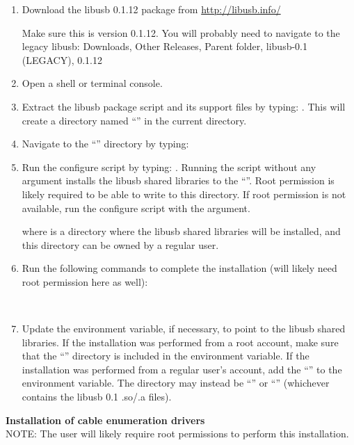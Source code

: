 \begin{enumerate}
\item Download the libusb 0.1.12 package from \url{http://libusb.info/}

Make sure this is version 0.1.12. You will probably need to navigate to the legacy libusb:
\subitem Downloads, Other Releases, Parent folder, libusb-0.1 (LEGACY), 0.1.12
\item Open a shell or terminal console.
\item Extract the libusb package script and its support files by typing: . This will create a directory named ``'' in the current directory.
\item Navigate to the ``'' directory by typing: \\
\item Run the configure script by typing: . Running the  script without any argument installs the libusb shared libraries to the ``''. Root permission is likely required to be able to write to this directory. If root permission is not available, run the configure script with the  argument. \\

where  is a directory where the libusb shared libraries will be installed, and this directory can be owned by a regular user.

\item Run the following commands to complete the installation (will likely need root permission here as well):

 \\

\item Update the  environment variable, if necessary, to point to the libusb shared libraries. If the installation was performed from a root account, make sure that the ``'' directory is included in the  environment variable. If the installation was performed from a regular user's account, add the ``'' to the  environment variable. The directory may instead be ``'' or ``'' (whichever contains the libusb 0.1 .so/.a files).

\end{enumerate}
\textbf{Installation of cable enumeration drivers} \\
NOTE: The user will likely require root permissions to perform this installation.

